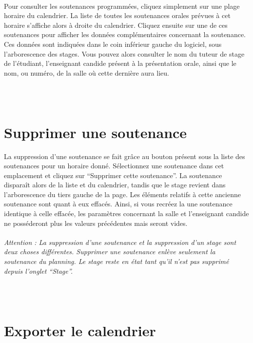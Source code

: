 \documentclass[a4paper,10pt]{report}
\begin{document}
      \paragraph{}
	Pour consulter les soutenances programmées, cliquez simplement sur une plage horaire du calendrier.
	La liste de toutes les soutenances orales prévues à cet horaire s'affiche alors à droite du calendrier.
	Cliquez ensuite sur une de ces soutenances pour afficher les données complémentaires concernant la soutenance.
	Ces données sont indiquées dans le coin inférieur gauche du logiciel, sous l'arborescence des stages.
	Vous pouvez alors consulter le nom du tuteur de stage de l'étudiant, l'enseignant candide présent à la présentation orale, ainsi que le nom, ou numéro, de la salle où cette dernière aura lieu.
      
      ~\\~\\
    \section{Supprimer une soutenance}
      \paragraph{}
	La suppression d'une soutenance se fait grâce au bouton présent sous la liste des soutenances pour un horaire donné.
	Sélectionnez une soutenance dans cet emplacement et cliquez sur ``Supprimer cette soutenance''.
	La soutenance disparaît alors de la liste et du calendrier, tandis que le stage revient dans l'arborescence du tiers gauche de la page.
	Les éléments relatifs à cette ancienne soutenance sont quant à eux effacés.
	Ainsi, si vous recréez la une soutenance identique à celle effacée, les paramètres concernant la salle et l'enseignant candide ne posséderont plus les valeurs précédentes mais seront vides.
	
      \paragraph{}
	\textit{Attention : La suppression d'une soutenance et la suppression d'un stage sont deux choses différentes. Supprimer une soutenance enlève seulement la soutenance du planning. Le stage reste en état tant qu'il n'est pas supprimé depuis l'onglet ``Stage''.}
      
      ~\\~\\
    \section{Exporter le calendrier}
\end{document}
